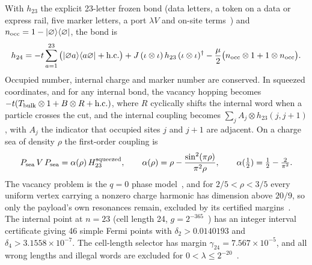 \documentclass[11pt]{article}
\theoremstyle{definition}
\newcommand{\ket}[1]{|#1\rangle}
\newcommand{\bra}[1]{\langle #1|}
\begin{document}
With $h_{23}$ the explicit 23-letter frozen bond (data letters, a token on a data or express rail, five marker letters, a port $\lambda V$ and on-site terms~\cite{explicit}) and $n_{\rm occ}=1-\ket{\varnothing}\bra{\varnothing}$, the bond is
\begin{align}
h_{24}=-t\sum_{a=1}^{23}\big(\ket{\varnothing a}\bra{a\varnothing}+\text{h.c.}\big)+J\,(\iota\otimes\iota)\,h_{23}\,(\iota\otimes\iota)^\dagger-\frac{\mu}{2}\big(n_{\rm occ}\otimes1+1\otimes n_{\rm occ}\big).
\label{eq:h24}
\end{align}
Occupied number, internal charge and marker number are conserved. In squeezed coordinates, and for any internal bond, the vacancy hopping becomes $-t(T_{\rm bulk}\otimes1+B\otimes R+\text{h.c.})$, where $R$ cyclically shifts the internal word when a particle crosses the cut, and the internal coupling becomes $\sum_jA_j\otimes h_{23}(j,j+1)$, with $A_j$ the indicator that occupied sites $j$ and $j+1$ are adjacent. On a charge sea of density $\rho$ the first-order coupling is
\begin{align}
P_{\rm sea}\,V\,P_{\rm sea}=\alpha(\rho)\,H_{23}^{\rm squeezed},\qquad \alpha(\rho)=\rho-\frac{\sin^2(\pi\rho)}{\pi^2\rho},\qquad \alpha(\tfrac12)=\tfrac12-\tfrac{2}{\pi^2}.
\label{eq:alpha}
\end{align}
The vacancy problem is the $q=0$ phase model~\cite{BortzSergeev}, and for $2/5<\rho<3/5$ every uniform vertex carrying a nonzero charge harmonic has dimension above $20/9$, so only the payload's own resonances remain, excluded by its certified margins~\cite{campaign,C41}. The internal point at $n=23$ (cell length 24, $g=2^{-365}$~\cite{C33}) has an integer interval certificate giving 46 simple Fermi points with $\delta_2>0.0140193$ and $\delta_4>3.1558\times10^{-7}$. The cell-length selector has margin $\gamma_{24}=7.567\times10^{-5}$, and all wrong lengths and illegal words are excluded for $0<\lambda\le2^{-20}$~\cite{campaign}.
\end{document}
